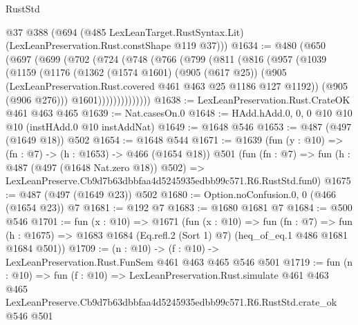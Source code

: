 \begin{lexlean}{RustStd}
\begin{coremodule}
      @37
      @388
      (@694 (@485 LexLeanTarget.RustSyntax.Lit) (LexLeanPreservation.Rust.constShape @119 @37)))
@1634 := @480
    (@650
      (@697
        (@699
          (@702
            (@724
              (@748
                (@766
                  (@799
                    (@811
                      (@816
                        (@957
                          (@1039
                            (@1159
                              (@1176
                                (@1362
                                  (@1574 @1601)
                                  (@905 (@617 @25))
                                  (@905
                                    (LexLeanPreservation.Rust.covered
                                      @461
                                      @463
                                      @25
                                      @1186
                                      @127
                                      @1192))
                                  (@905 (@906 @276)))
                                @1601))))))))))))))
@1638 := LexLeanPreservation.Rust.CrateOK @461 @463 @465
@1639 := Nat.casesOn.{0}
@1648 := HAdd.hAdd.{0, 0, 0} @10 @10 @10 (instHAdd.{0} @10 instAddNat)
@1649 := @1648 @546
@1653 := @487 (@497 (@1649 @18)) @502
@1654 := @1648 @544
@1671 := @1639
    (fun (y : @10) => (fn : @7) -> (h : @1653) -> @466 (@1654 @18))
    @501
    (fun (fn : @7) =>
    fun (h : @487 (@497 (@1648 Nat.zero @18)) @502) =>
    LexLeanPreserve.Cb9d7b63dbbfaa4d5245935edbb99c571.R6.RustStd.fun0)
@1675 := @487 (@497 (@1649 @23)) @502
@1680 := Option.noConfusion.{0, 0} (@466 (@1654 @23)) @7
@1681 := @192 @7
@1683 := @1680 @1681 @7
@1684 := @500 @546
@1701 := fun (x : @10) =>
  @1671
    (fun (x : @10) =>
    fun (fn : @7) =>
    fun (h : @1675) => @1683 @1684 (Eq.refl.{2} (Sort 1) @7) (heq_of_eq.{1} @486 @1681 @1684 @501))
@1709 := (n : @10) -> (f : @10) -> LexLeanPreservation.Rust.FunSem @461 @463 @465 @546 @501
@1719 := fun (n : @10) =>
  fun (f : @10) =>
  LexLeanPreservation.Rust.simulate
    @461
    @463
    @465
    LexLeanPreserve.Cb9d7b63dbbfaa4d5245935edbb99c571.R6.RustStd.crate_ok
    @546
    @501
\end{coremodule}
\end{lexlean}
